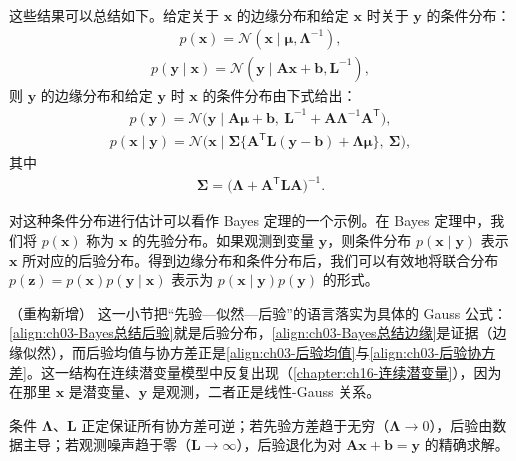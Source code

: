 \documentclass[../../main.tex]{subfiles}
\begin{document}
这些结果可以总结如下。给定关于 $\boldsymbol{x}$ 的边缘分布和给定 $\boldsymbol{x}$ 时关于 $\boldsymbol{y}$ 的条件分布：
\begin{align}
p(\boldsymbol{x})=\mathcal{N}(\boldsymbol{x}\mid\boldsymbol{\mu},\boldsymbol{\Lambda}^{-1}),
\label{align:ch03-Bayes总结先验}
\end{align}
\begin{align}
p(\boldsymbol{y}\mid\boldsymbol{x})=\mathcal{N}(\boldsymbol{y}\mid\boldsymbol{A}\boldsymbol{x}+\boldsymbol{b},\boldsymbol{L}^{-1}),
\label{align:ch03-Bayes总结条件}
\end{align}
则 $\boldsymbol{y}$ 的边缘分布和给定 $\boldsymbol{y}$ 时 $\boldsymbol{x}$ 的条件分布由下式给出：
\begin{align}
p(\boldsymbol{y})=\mathcal{N}\bigl(\boldsymbol{y}\mid\boldsymbol{A}\boldsymbol{\mu}+\boldsymbol{b},\ \boldsymbol{L}^{-1}+\boldsymbol{A}\boldsymbol{\Lambda}^{-1}\boldsymbol{A}^{\mathsf{T}}\bigr),
\label{align:ch03-Bayes总结边缘}
\end{align}
\begin{align}
p(\boldsymbol{x}\mid\boldsymbol{y})=\mathcal{N}\bigl(\boldsymbol{x}\mid\boldsymbol{\Sigma}\{\boldsymbol{A}^{\mathsf{T}}\boldsymbol{L}(\boldsymbol{y}-\boldsymbol{b})+\boldsymbol{\Lambda}\boldsymbol{\mu}\},\ \boldsymbol{\Sigma}\bigr),
\label{align:ch03-Bayes总结后验}
\end{align}
其中
\begin{align}
\boldsymbol{\Sigma}=\bigl(\boldsymbol{\Lambda}+\boldsymbol{A}^{\mathsf{T}}\boldsymbol{L}\boldsymbol{A}\bigr)^{-1}.
\label{align:ch03-Bayes总结后验协方差}
\end{align}

对这种条件分布进行估计可以看作 Bayes 定理的一个示例。在 Bayes 定理中，我们将 $p(\boldsymbol{x})$ 称为 $\boldsymbol{x}$ 的先验分布。如果观测到变量 $\boldsymbol{y}$，则条件分布 $p(\boldsymbol{x}\mid\boldsymbol{y})$ 表示 $\boldsymbol{x}$ 所对应的后验分布。得到边缘分布和条件分布后，我们可以有效地将联合分布 $p(\boldsymbol{z})=p(\boldsymbol{x})p(\boldsymbol{y}\mid\boldsymbol{x})$ 表示为 $p(\boldsymbol{x}\mid\boldsymbol{y})p(\boldsymbol{y})$ 的形式。

\begin{remark}（重构新增）
这一小节把“先验—似然—后验”的语言落实为具体的 Gauss 公式：\eqref{align:ch03-Bayes总结后验}就是后验分布，\eqref{align:ch03-Bayes总结边缘}是证据（边缘似然），而后验均值与协方差正是\eqref{align:ch03-后验均值}与\eqref{align:ch03-后验协方差}。这一结构在连续潜变量模型中反复出现（\cref{chapter:ch16-连续潜变量}），因为在那里 $\boldsymbol{x}$ 是潜变量、$\boldsymbol{y}$ 是观测，二者正是线性-Gauss 关系。

条件 $\boldsymbol{\Lambda}$、$\boldsymbol{L}$ 正定保证所有协方差可逆；若先验方差趋于无穷（$\boldsymbol{\Lambda}\to0$），后验由数据主导；若观测噪声趋于零（$\boldsymbol{L}\to\infty$），后验退化为对 $\boldsymbol{A}\boldsymbol{x}+\boldsymbol{b}=\boldsymbol{y}$ 的精确求解。
\end{remark}
\end{document}
